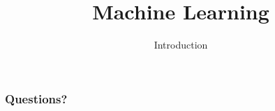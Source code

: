 
\title{Machine Learning}
\subtitle{Introduction}




\begin{frame}
  \titlepage
\end{frame}


\begin{frame}
  \phrase{}
\end{frame}

\begin{frame}
  \frametitle{}
  \begin{mphrase}
    
  \end{mphrase}
\end{frame}



\begin{frame}
  \frametitle{Questions?}
\end{frame}


